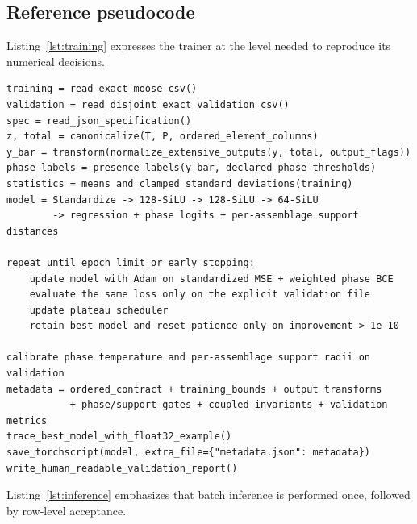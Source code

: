 \documentclass[11pt]{article}
\begin{document}
\subsection{Reference pseudocode}

Listing~\ref{lst:training} expresses the trainer at the level needed to reproduce its numerical
decisions.

\begin{lstlisting}[caption={Deterministic training and archive export.},label={lst:training}]
training = read_exact_moose_csv()
validation = read_disjoint_exact_validation_csv()
spec = read_json_specification()
z, total = canonicalize(T, P, ordered_element_columns)
y_bar = transform(normalize_extensive_outputs(y, total, output_flags))
phase_labels = presence_labels(y_bar, declared_phase_thresholds)
statistics = means_and_clamped_standard_deviations(training)
model = Standardize -> 128-SiLU -> 128-SiLU -> 64-SiLU
        -> regression + phase logits + per-assemblage support distances

repeat until epoch limit or early stopping:
    update model with Adam on standardized MSE + weighted phase BCE
    evaluate the same loss only on the explicit validation file
    update plateau scheduler
    retain best model and reset patience only on improvement > 1e-10

calibrate phase temperature and per-assemblage support radii on validation
metadata = ordered_contract + training_bounds + output transforms
           + phase/support gates + coupled invariants + validation metrics
trace_best_model_with_float32_example()
save_torchscript(model, extra_file={"metadata.json": metadata})
write_human_readable_validation_report()
\end{lstlisting}

Listing~\ref{lst:inference} emphasizes that batch inference is performed once, followed by
row-level acceptance.
\end{document}
